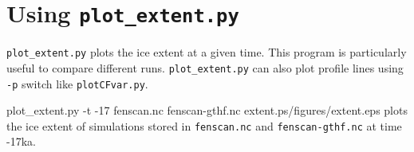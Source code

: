 \section{Using \texttt{plot\_extent.py}}
\texttt{plot\_extent.py} plots the ice extent at a given time. This program is particularly useful to compare different runs. \texttt{plot\_extent.py} can also plot profile lines using \texttt{-p} switch like \texttt{plotCFvar.py}.

\begin{pycf}{plot\_extent.py -t -17 fenscan.nc fenscan-gthf.nc extent.ps}{\dir/figures/extent.eps}
plots the ice extent of simulations stored in \texttt{fenscan.nc} and \texttt{fenscan-gthf.nc} at time -17ka.
\end{pycf}
